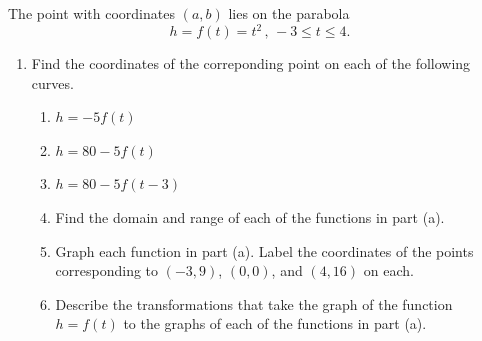 \documentclass{ximera}
\begin{document}
\begin{question} \label{Qdrer3f39}

The point with coordinates $(a,b)$ lies on the parabola
\[
   h = f(t) = t^2 \, , \, -3 \leq t \leq 4.
\]

\begin{enumerate}
\item Find the coordinates of the correponding point on each of the following curves.

\begin{enumerate}
     \item $h = -5f(t)$

     \item $h=80 - 5f(t)$ 

      \item $h=80 - 5f(t-3)$

\item Find the domain and range of each of the functions in part (a).

\item Graph each function in part (a). Label the coordinates of the points corresponding to $(-3,9)$, $(0,0)$, and $(4,16)$ on each.

\item  Describe the transformations that take the graph of the function $h=f(t)$ to the graphs of each of the functions in part (a).

\end{enumerate}
\end{enumerate}
\end{question}
\end{document}
